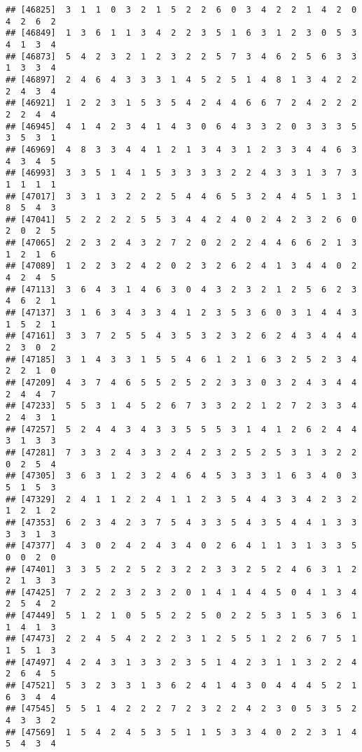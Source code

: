 \documentclass[
]{article}
\begin{document}
\begin{verbatim}
## [46825]  3  1  1  0  3  2  1  5  2  2  6  0  3  4  2  2  1  4  2  0  4  2  6  2
## [46849]  1  3  6  1  1  3  4  2  2  3  5  1  6  3  1  2  3  0  5  3  4  1  3  4
## [46873]  5  4  2  3  2  1  2  3  2  2  5  7  3  4  6  2  5  6  3  3  1  3  3  4
## [46897]  2  4  6  4  3  3  3  1  4  5  2  5  1  4  8  1  3  4  2  2  2  4  3  4
## [46921]  1  2  2  3  1  5  3  5  4  2  4  4  6  6  7  2  4  2  2  2  2  2  4  4
## [46945]  4  1  4  2  3  4  1  4  3  0  6  4  3  3  2  0  3  3  3  5  3  5  3  1
## [46969]  4  8  3  3  4  4  1  2  1  3  4  3  1  2  3  3  4  4  6  3  4  3  4  5
## [46993]  3  3  5  1  4  1  5  3  3  3  3  2  2  4  3  3  1  3  7  3  1  1  1  1
## [47017]  3  3  1  3  2  2  2  5  4  4  6  5  3  2  4  4  5  1  3  1  8  5  4  3
## [47041]  5  2  2  2  2  5  5  3  4  4  2  4  0  2  4  2  3  2  6  0  2  0  2  5
## [47065]  2  2  3  2  4  3  2  7  2  0  2  2  2  4  4  6  6  2  1  3  1  2  1  6
## [47089]  1  2  2  3  2  4  2  0  2  3  2  6  2  4  1  3  4  4  0  2  4  2  4  5
## [47113]  3  6  4  3  1  4  6  3  0  4  3  2  3  2  1  2  5  6  2  3  4  6  2  1
## [47137]  3  1  6  3  4  3  3  4  1  2  3  5  3  6  0  3  1  4  4  3  1  5  2  1
## [47161]  3  3  7  2  5  5  4  3  5  3  2  3  2  6  2  4  3  4  4  4  2  3  0  2
## [47185]  3  1  4  3  3  1  5  5  4  6  1  2  1  6  3  2  5  2  3  4  2  2  1  0
## [47209]  4  3  7  4  6  5  5  2  5  2  2  3  3  0  3  2  4  3  4  4  2  4  4  7
## [47233]  5  5  3  1  4  5  2  6  7  3  3  2  2  1  2  7  2  3  3  4  2  4  3  1
## [47257]  5  2  4  4  3  4  3  3  5  5  5  3  1  4  1  2  6  2  4  4  3  1  3  3
## [47281]  7  3  3  2  4  3  3  2  4  2  3  2  5  2  5  3  1  3  2  2  0  2  5  4
## [47305]  3  6  3  1  2  3  2  4  6  4  5  3  3  3  1  6  3  4  0  3  5  1  5  3
## [47329]  2  4  1  1  2  2  4  1  1  2  3  5  4  4  3  3  4  2  3  2  1  2  1  2
## [47353]  6  2  3  4  2  3  7  5  4  3  3  5  4  3  5  4  4  1  3  3  3  3  1  3
## [47377]  4  3  0  2  4  2  4  3  4  0  2  6  4  1  1  3  1  3  3  5  0  0  2  0
## [47401]  3  3  5  2  2  5  2  3  2  2  3  3  2  5  2  4  6  3  1  2  2  1  3  3
## [47425]  7  2  2  2  3  2  3  2  0  1  4  1  4  4  5  0  4  1  3  4  2  5  4  2
## [47449]  5  1  2  1  0  5  5  2  2  5  0  2  2  5  3  1  5  3  6  1  1  4  1  3
## [47473]  2  2  4  5  4  2  2  2  3  1  2  5  5  1  2  2  6  7  5  1  1  5  1  3
## [47497]  4  2  4  3  1  3  3  2  3  5  1  4  2  3  1  1  3  2  2  4  2  6  4  5
## [47521]  5  3  2  3  3  1  3  6  2  4  1  4  3  0  4  4  4  5  2  1  6  3  4  4
## [47545]  5  5  1  4  2  2  2  7  2  3  2  2  4  2  3  0  5  3  5  2  4  3  3  2
## [47569]  1  5  4  2  4  5  3  5  1  1  5  3  3  4  0  2  2  3  1  4  5  4  3  4

\end{verbatim}
\end{document}
